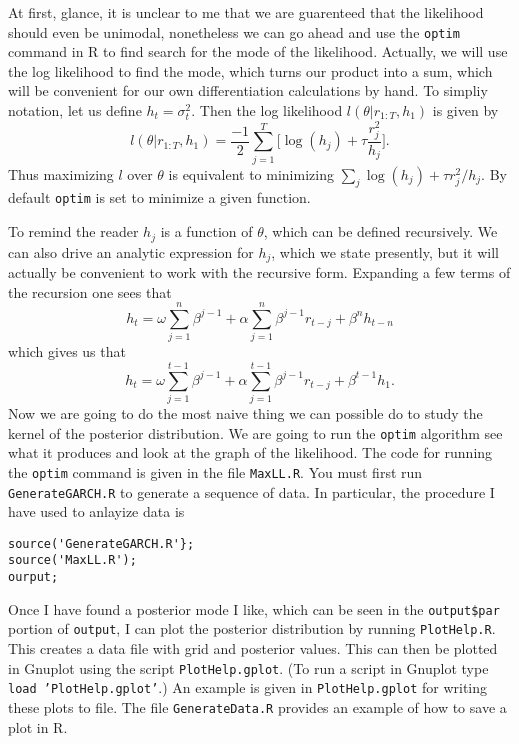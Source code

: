 \documentclass{article}
\begin{document}
\begin{description}
At first, glance, it is unclear to me that we are guarenteed that the likelihood should even be unimodal, nonetheless we can go ahead and use the \texttt{optim} command in R to find search for the mode of the likelihood.  Actually, we will use the log likelihood to find the mode, which turns our product into a sum, which will be convenient for our own differentiation calculations by hand.  To simpliy notation, let us define $h_t = \sigma_t^2$.  Then the log likelihood $l(\theta | r_{1:T}, h_1)$ is given by
\[
l(\theta | r_{1:T}, h_1) = \frac{-1}{2} \sum_{j=1}^T 
\Big[ \log (h_j) + \tau \frac{r_j^2}{h_j} \Big].
\]
Thus maximizing $l$ over $\theta$ is equivalent to minimizing $\sum_j  \log(h_j) + \tau r_j^2 / h_j $.  By default \texttt{optim} is set to minimize a given function.

To remind the reader $h_j$ is a function of $\theta$, which can be defined recursively.  We can also drive an analytic expression for $h_j$, which we state presently, but it will actually be convenient to work with the recursive form.  Expanding a few terms of the recursion one sees that
\[
h_t = \omega \sum_{j=1}^{n} \beta^{j-1} + \alpha \sum_{j=1}^n \beta^{j-1} r_{t-j} + \beta^{n} h_{t-n}
\]
which gives us that
\[
h_t = \omega \sum_{j=1}^{t-1} \beta^{j-1} + \alpha \sum_{j=1}^{t-1} \beta^{j-1} r_{t-j} + \beta^{t-1} h_{1}.
\]
Now we are going to do the most naive thing we can possible do to study the kernel of the posterior distribution.  We are going to run the \texttt{optim} algorithm see what it produces and look at the graph of the likelihood.  The code for running the \texttt{optim} command is given in the file \texttt{MaxLL.R}.  You must first run \texttt{GenerateGARCH.R} to generate a sequence of data.  In particular, the procedure I have used to anlayize data is
\begin{verbatim}
source('GenerateGARCH.R'};
source('MaxLL.R');
ourput;
\end{verbatim}
Once I have found a posterior mode I like, which can be seen in the \texttt{output\$par} portion of \texttt{output}, I can plot the posterior distribution by running \texttt{PlotHelp.R}.  This creates a data file with grid and posterior values.  This can then be plotted in Gnuplot using the script \texttt{PlotHelp.gplot}.  (To run a script in Gnuplot type \texttt{load 'PlotHelp.gplot'}.)  An example is given in \texttt{PlotHelp.gplot} for writing these plots to file.  The file \texttt{GenerateData.R} provides an example of how to save a plot in R.


\end{description}
\end{document}
